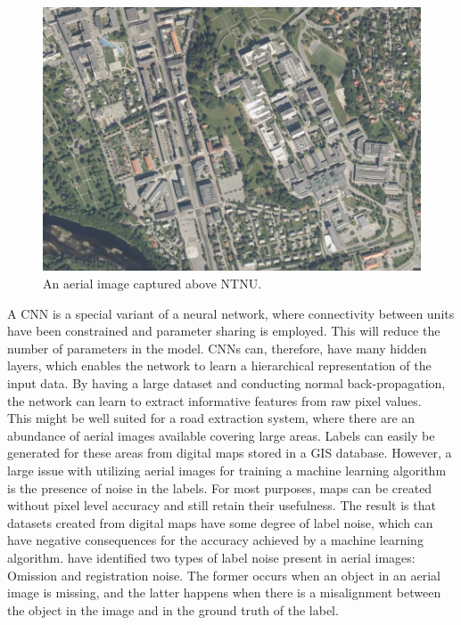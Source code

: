 \begin{figure}[t]
\begin{center}
\includegraphics[width=0.8\columnwidth]{figs/aerial_image.png}
\caption[Aerial image]{An aerial image captured above NTNU.}
\label{fig:aerialimage}
\end{center}
\end{figure}

A \ac{CNN} is a special variant of a neural network, where connectivity between units have been constrained and parameter sharing is employed. This will reduce the number of parameters in the model. \ac{CNN}s can, therefore, have many hidden layers, which enables the network to learn a hierarchical representation of the input data. By having a large dataset and conducting normal back-propagation, the network can learn to extract informative features from raw pixel values. \\

This might be well suited for a road extraction system, where there are  an abundance of aerial images available covering large areas. Labels can easily be generated for these areas from digital maps stored in a \ac{GIS} database. However, a large issue with utilizing aerial images for training a machine learning algorithm is the presence of noise in the labels. For most purposes, maps can be created without pixel level accuracy and still retain their usefulness. The result is that datasets created from digital maps have some degree of label noise, which can have negative consequences for the accuracy achieved by a machine learning algorithm. \cite{Mnih_aerial_images_noisy} have identified two types of label noise present in aerial images: Omission and registration noise. The former occurs when an object in an aerial image is missing, and the latter happens when there is a misalignment between the object in the image and in the ground truth of the label.\\

